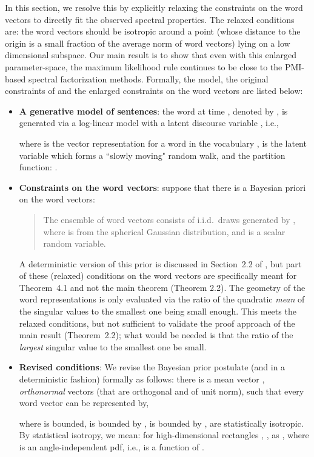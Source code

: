 \documentclass{article} \usepackage{acl2017,times}
\begin{document}
In this section, we  resolve this by explicitly  relaxing the constraints on the word vectors to directly fit the observed spectral properties.  The relaxed conditions are: the word vectors should be isotropic around a point (whose distance to the origin is a  small fraction of the average norm of word vectors) lying on a low dimensional subspace. Our main result is to show that even with this enlarged parameter-space, the maximum likelihood rule continues to be close to the PMI-based spectral factorization methods.  
Formally,  the model, the original constraints of \citep{arora2015rand} and the enlarged constraints on the word vectors are listed  below: 
\begin{itemize}\item {\bf A generative model of sentences}: the word at time , denoted by , is generated via a log-linear model with a latent discourse variable  \citep{arora2015rand}, i.e.,
    
    where  is the vector representation for a word  in the vocabulary ,  is the latent variable which forms a ``slowly moving" random walk, and  the partition function:  .
    \item {\bf Constraints on the word vectors}: \citep{arora2015rand} suppose that there is a Bayesian priori on the word vectors: 
    \begin{quote}
      The ensemble of word vectors consists of i.i.d.\ draws generated by , where  is from the spherical Gaussian distribution, and  is a scalar random variable.
    \end{quote}
A deterministic version of this  prior is  discussed in Section~2.2 of \citep{arora2015rand}, but part of these (relaxed) conditions on the word vectors are specifically meant for Theorem~4.1 and not the main theorem (Theorem 2.2).  The geometry of the word representations is only evaluated via the ratio of the  quadratic {\em mean} of the singular values to the smallest one being small enough. This meets the relaxed conditions, but not sufficient to validate the proof approach of the main result  (Theorem~2.2); what would be needed is that the ratio  of the {\em largest} singular value to the smallest one  be small. 

\item{\bf Revised conditions}: We revise the Bayesian prior postulate (and in a deterministic fashion) formally as follows:  there is a mean vector ,  {\em orthonormal} vectors  (that are orthogonal and of unit norm), such that  every word vector  can be represented by,
    
    where  is bounded,  is bounded by ,  is bounded by ,  are statistically isotropic. By statistical isotropy, we mean: for  high-dimensional rectangles , , as , where  is an angle-independent pdf, i.e.,  is a function of . 
\end{itemize}
\end{document}
